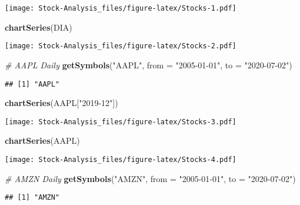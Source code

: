 \documentclass[
]{article}
\newenvironment{Shaded}{\begin{snugshade}}{\end{snugshade}}
\newcommand{\CommentTok}[1]{\textcolor[rgb]{0.56,0.35,0.01}{\textit{#1}}}
\newcommand{\DataTypeTok}[1]{\textcolor[rgb]{0.13,0.29,0.53}{#1}}
\newcommand{\KeywordTok}[1]{\textcolor[rgb]{0.13,0.29,0.53}{\textbf{#1}}}
\newcommand{\NormalTok}[1]{#1}
\newcommand{\StringTok}[1]{\textcolor[rgb]{0.31,0.60,0.02}{#1}}
\begin{document}
\texttt{[image: Stock-Analysis\_files/figure-latex/Stocks-1.pdf]}

\begin{Shaded}
\begin{Highlighting}[]
\KeywordTok{chartSeries}\NormalTok{(DIA)}
\end{Highlighting}
\end{Shaded}

\texttt{[image: Stock-Analysis\_files/figure-latex/Stocks-2.pdf]}

\begin{Shaded}
\begin{Highlighting}[]
\CommentTok{# AAPL Daily}
\KeywordTok{getSymbols}\NormalTok{(}\StringTok{"AAPL"}\NormalTok{,}
           \DataTypeTok{from =} \StringTok{"2005-01-01"}\NormalTok{,}
           \DataTypeTok{to =} \StringTok{"2020-07-02"}\NormalTok{)}
\end{Highlighting}
\end{Shaded}

\begin{verbatim}
## [1] "AAPL"
\end{verbatim}

\begin{Shaded}
\begin{Highlighting}[]
\KeywordTok{chartSeries}\NormalTok{(AAPL[}\StringTok{"2019-12"}\NormalTok{])}
\end{Highlighting}
\end{Shaded}

\texttt{[image: Stock-Analysis\_files/figure-latex/Stocks-3.pdf]}

\begin{Shaded}
\begin{Highlighting}[]
\KeywordTok{chartSeries}\NormalTok{(AAPL)}
\end{Highlighting}
\end{Shaded}

\texttt{[image: Stock-Analysis\_files/figure-latex/Stocks-4.pdf]}

\begin{Shaded}
\begin{Highlighting}[]
\CommentTok{# AMZN Daily}
\KeywordTok{getSymbols}\NormalTok{(}\StringTok{"AMZN"}\NormalTok{,}
           \DataTypeTok{from =} \StringTok{"2005-01-01"}\NormalTok{,}
           \DataTypeTok{to =} \StringTok{"2020-07-02"}\NormalTok{)}
\end{Highlighting}
\end{Shaded}

\begin{verbatim}
## [1] "AMZN"
\end{verbatim}
\end{document}

